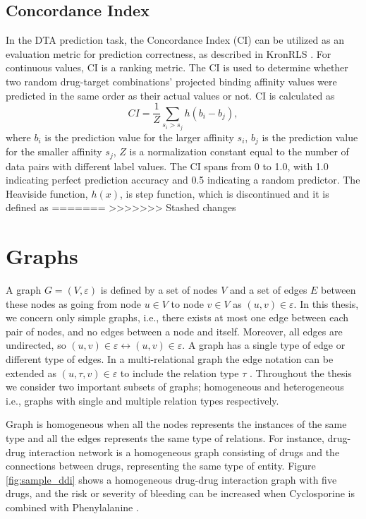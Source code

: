 \subsection{Concordance Index}
In the DTA prediction task, the Concordance Index (CI) can be utilized as an evaluation metric for prediction correctness, as described in KronRLS \cite{pahikkala2015toward}. For continuous values, CI is a ranking metric. The CI is used to determine whether two random drug-target combinations' projected binding affinity values were predicted in the same order as their actual values or not. CI is calculated as
\begin{equation}
    CI =  \frac{1}{Z}\sum_{s_{i} > s_{j}}^{}h(b_{i}-b_{j}),
\end{equation}
\noindent where $b_i$ is the prediction value for the larger affinity $s_i$, $b_j$ is the prediction value for the smaller affinity $s_j$, $Z$ is a normalization constant equal to the number of data pairs with different label values. The CI spans from 0 to 1.0, with 1.0 indicating perfect prediction accuracy and 0.5 indicating a random predictor. The Heaviside function, $h(x)$, is \cite{gonen2005concordance} step function, which is discontinued and it is defined as
=======
>>>>>>> Stashed changes
\section{Graphs}
A graph $G = (V, \varepsilon)$ is defined by a set of nodes $V$ and a set of edges $E$ between these nodes as going from node $u \in V$ to node $v \in V$ as $(u,v) \in \varepsilon$. In this thesis, we concern only simple graphs, i.e., there exists at most one edge between each pair of nodes, and no edges between  a node and itself. Moreover, all edges are undirected, so $(u,v) \in \varepsilon \longleftrightarrow (u,v) \in \varepsilon$. A graph has a single type of edge or different type of edges. In a multi-relational graph the edge notation can be extended as $(u,\tau,v) \in \varepsilon$ to include the relation type $\tau$ \cite{hamilton2020graph}. Throughout the thesis we consider two important subsets of graphs; homogeneous and heterogeneous i.e., graphs with single and multiple relation types respectively. 

Graph is homogeneous when all the nodes represents the instances of the same type and all the edges represents the same type of relations. For instance, drug-drug interaction network is a homogeneous graph consisting of drugs and the connections between drugs, representing the same type of entity. Figure \ref{fig:sample_ddi} shows a homogeneous drug-drug interaction graph with five drugs, and the risk or severity of bleeding can be increased when Cyclosporine is combined with Phenylalanine \cite{ihlefeldt2014polymorphs}. 

